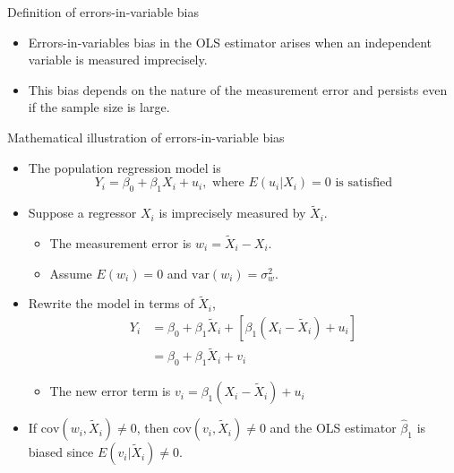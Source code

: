 \documentclass[presentation,10pt]{beamer}
\newcommand{\var}{\mathrm{var}}
\newcommand{\cov}{\mathrm{cov}}
\begin{document}
\begin{frame}[label={sec:org24fff68}]{Definition of errors-in-variable bias}
\begin{itemize}
\item \alert{Errors-in-variables bias} in the OLS estimator arises when an
independent variable is measured imprecisely.
\end{itemize}

\vspace{0.3cm}

\begin{itemize}
\item This bias depends on the nature of the measurement error and persists
even if the sample size is large.
\end{itemize}
\end{frame}

\begin{frame}[label={sec:org37efb02}]{Mathematical illustration of errors-in-variable bias}
\begin{itemize}
\item The population regression model is 
\[ Y_i = \beta_0 + \beta_1 X_i + u_i, \text{ where } E(u_i | X_i) =
  0 \text{ is satisfied}  \]

\item Suppose a regressor \(X_i\) is imprecisely measured by
\(\tilde{X}_i\).
\begin{itemize}
\item The measurement error is \(w_i = \tilde{X}_i - X_i\).
\item Assume \(E(w_i) = 0\) and \(\var(w_i) = \sigma^2_w\).
\end{itemize}

\item Rewrite the model in terms of \(\tilde{X}_i\),
\begin{equation}
\begin{split}
Y_i &= \beta_0 + \beta_1 \tilde{X}_i + [\beta_1 (X_i - \tilde{X}_i) + u_i] \\
    &= \beta_0 + \beta_1 \tilde{X}_i + v_i \label{eq:err-in-var}
\end{split}
\end{equation}
\begin{itemize}
\item The new error term is \(v_i = \beta_1(X_i - \tilde{X}_i) + u_i\)
\end{itemize}

\item If \(\cov(w_i, \tilde{X}_i) \neq 0\), then \(\cov(v_i, \tilde{X}_i)
  \neq 0\) and the OLS estimator \(\hat{\beta}_1\) is biased since
\(E(v_i | \tilde{X}_i) \neq 0\).
\end{itemize}
\end{frame}
\end{document}

